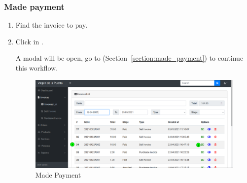 \documentclass[a4paper,11pt]{refart}
\begin{document}
\subsubsection{Made payment}
\begin{enumerate}
	\item Find the invoice to pay.
	\item Click in .
	\medskip
	\begin{leftbar}
		A modal will be open, go to (Section~\ref{section:made_payment}) to continue this workflow.
	\end{leftbar}
	\begin{figure}[H]\centering
		\includegraphics[width=\textwidth]{images/invoice_list-made-payment.png}
		\caption{Made Payment}
		\label{fig:invoice_list-made-payment}
	\end{figure}
\end{enumerate}
\end{document}
